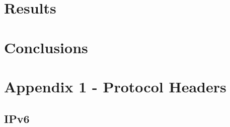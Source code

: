 \documentclass[12pt]{article}
\begin{document}
\pagebreak

\section{Results}
\label{sec:6}

\pagebreak

\section{Conclusions}
\label{sec:7}

\pagebreak








\pagebreak

\section*{Appendix 1 - Protocol Headers}
\label{Appendix 1}

\subsection*{IPv6}
\end{document}
